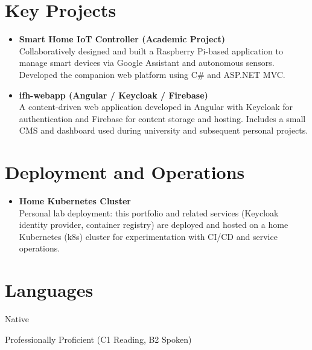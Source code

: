 \documentclass[a4paper,10pt]{article}
\newenvironment{entrylist}{
    \begin{itemize}[leftmargin=*, label={}, noitemsep, topsep=0pt]
}{
    \end{itemize}
}
\newcommand{\project}[2]{
    \item
    \textbf{#1} \\
    #2
}
\begin{document}
\section*{Key Projects}
\begin{entrylist}
    \project{Smart Home IoT Controller (Academic Project)}{
    Collaboratively designed and built a Raspberry Pi-based application to manage smart devices via Google Assistant and autonomous sensors. Developed the companion web platform using C\# and ASP.NET MVC.
    }
    \project{ifh-webapp (Angular / Keycloak / Firebase)}{A content-driven web application developed in Angular with Keycloak for authentication and Firebase for content storage and hosting. Includes a small CMS and dashboard used during university and subsequent personal projects.}
\end{entrylist}

\section*{Deployment and Operations}
\begin{entrylist}
    \project{Home Kubernetes Cluster}{Personal lab deployment: this portfolio and related services (Keycloak identity provider, container registry) are deployed and hosted on a home Kubernetes (k8s) cluster for experimentation with CI/CD and service operations.}
\end{entrylist}

\section*{Languages}
\begin{description}[style=unboxed, noitemsep]
    \item[Italian] Native
    \item[English] Professionally Proficient (C1 Reading, B2 Spoken)
\end{description}
\end{document}
